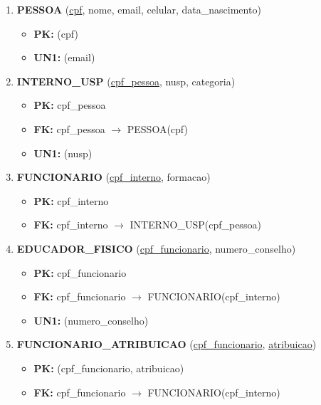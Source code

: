 \documentclass{article}
\begin{document}
\begin{enumerate}
    \item \textbf{PESSOA} (\underline{cpf}, nome, email, celular, data\_nascimento)
        \begin{itemize}
            \item \textbf{PK:} (cpf)
            \item \textbf{UN1:} (email)
        \end{itemize}

    \item \textbf{INTERNO\_USP} (\underline{cpf\_pessoa}, nusp, categoria)
        \begin{itemize}
            \item \textbf{PK:} cpf\_pessoa
            \item \textbf{FK:} cpf\_pessoa $\rightarrow$ PESSOA(cpf)
            \item \textbf{UN1:} (nusp)
        \end{itemize}

    \item \textbf{FUNCIONARIO} (\underline{cpf\_interno}, formacao)
        \begin{itemize}
            \item \textbf{PK:} cpf\_interno
            \item \textbf{FK:} cpf\_interno $\rightarrow$ INTERNO\_USP(cpf\_pessoa)
        \end{itemize}
        
    \item \textbf{EDUCADOR\_FISICO} (\underline{cpf\_funcionario}, numero\_conselho)
        \begin{itemize}
            \item \textbf{PK:} cpf\_funcionario
            \item \textbf{FK:} cpf\_funcionario $\rightarrow$ FUNCIONARIO(cpf\_interno)
            \item \textbf{UN1:} (numero\_conselho)
        \end{itemize}
        
    \item \textbf{FUNCIONARIO\_ATRIBUICAO} (\underline{cpf\_funcionario}, \underline{atribuicao})
        \begin{itemize}
            \item \textbf{PK:} (cpf\_funcionario, atribuicao)
            \item \textbf{FK:} cpf\_funcionario $\rightarrow$ FUNCIONARIO(cpf\_interno)
        \end{itemize}


\end{enumerate}
\end{document}
